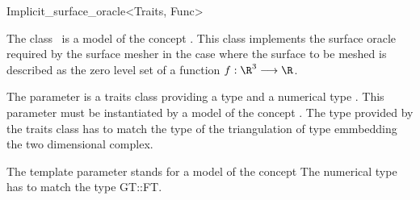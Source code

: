 

\begin{ccRefClass}{Implicit_surface_oracle<Traits, Func>}  %


\ccDefinition
  
The class \ccRefName\  is a model of the concept
. 
This class implements the surface oracle
required by the surface mesher 
in the case
where the surface to be meshed is described as the zero level
set  of a function $f : \R^3 \longrightarrow \R$.

The parameter  is a traits class providing 
a type  and a numerical type .
This parameter  must be instantiated by 
a model of the concept .
The  type provided by the traits class  
has to match  the  type of the
triangulation of  type  emmbedding
the two dimensional complex.

The template parameter   stands for a model
of the concept 
The numerical type  has to match
the type {GT::FT}.



\ccIsModel









\end{ccRefClass}
